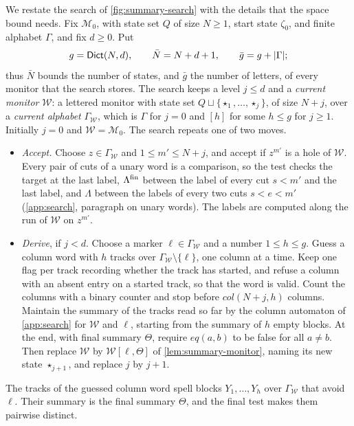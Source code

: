 We restate the search of \cref{fig:summary-search} with the details that the
space bound needs. Fix $\mathcal M_0$, with state set $Q$ of size $N\ge1$,
start state $\zeta_0$, and finite alphabet $\Gamma$, and fix $d\ge0$. Put
\[
 g=\mathsf{Dict}(N,d),\qquad \bar N=N+d+1,\qquad \bar g=g+|\Gamma|;
\]
thus $\bar N$ bounds the number of states, and $\bar g$ the number of
letters, of every monitor that the search stores.
The search keeps a level $j\le d$ and a \emph{current monitor}
$\mathcal W$: a lettered monitor with state set
$Q\sqcup\{\star_1,\ldots,\star_j\}$, of size $N+j$, over a \emph{current
alphabet} $\Gamma_{\mathcal W}$, which is $\Gamma$ for $j=0$ and $[h]$ for some
$h\le g$ for $j\ge1$. Initially $j=0$ and $\mathcal W=\mathcal M_0$. The
search repeats one of two moves.
\begin{itemize}[leftmargin=*]
\item \emph{Accept.} Choose $z\in\Gamma_{\mathcal W}$ and $1\le m'\le N+j$, and
  accept if $z^{m'}$ is a hole of $\mathcal W$. Every pair of cuts of a
  unary word is a comparison, so the test checks the target at the last
  label, $\Lambda^{\mathrm{fin}}$ between the label of every cut $s<m'$ and the last label,
  and $\Lambda$ between the labels of every two cuts $s<e<m'$
  (\cref{app:search}, paragraph on unary words). The labels are computed
  along the run of $\mathcal W$ on $z^{m'}$.
\item \emph{Derive}, if $j<d$. Choose a marker $\ell\in\Gamma_{\mathcal W}$ and a
  number $1\le h\le g$. Guess a column word with $h$ tracks over
  $\Gamma_{\mathcal W}\setminus\{\ell\}$, one column at a time. Keep one flag per
  track recording whether the track has started, and refuse a column with an
  absent entry on a started track, so that the word is valid. Count the
  columns with a binary counter and stop before $\mathit{col}(N+j,h)$
  columns. Maintain the summary of the tracks read so far by the column
  automaton of \cref{app:search} for $\mathcal W$ and $\ell$, starting from
  the summary of $h$ empty blocks. At the end, with final summary $\Theta$,
  require $\mathit{eq}(a,b)$ to be false for all $a\ne b$. Then replace
  $\mathcal W$ by $\mathcal W[\ell,\Theta]$ of \cref{lem:summary-monitor},
  naming its new state $\star_{j+1}$, and replace $j$ by $j+1$.
\end{itemize}
The tracks of the guessed column word spell blocks $Y_1,\ldots,Y_h$ over
$\Gamma_{\mathcal W}$ that avoid $\ell$. Their summary is the final summary
$\Theta$, and the final test makes them pairwise distinct.

